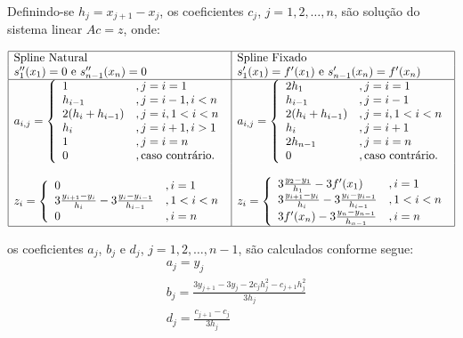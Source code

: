 Definindo-se $h_j = x_{j+1} - x_j$, os coeficientes $c_j$, $j=1,2,\dotsc,n$, são solução do sistema linear $Ac = z$, onde:
\begin{small}
  \begin{equation*}
  \begin{array}{|l|l|}\hline
    \text{Spline Natural} & \text{Spline Fixado}\\
    s_1''(x_1) = 0 \text{ e } s_{n-1}''(x_n) = 0 & s_1'(x_1) = f'(x_1) \text{ e } s_{n-1}'(x_n) = f'(x_n)\\ \hline
    a_{i,j} = \left\{
      \begin{array}{ll}
        1 &, j=i=1\\
        h_{i-1} &, j = i-1, i<n\\
        2(h_i + h_{i-1}) &, j=i, 1<i<n\\
        h_i &, j=i+1, i>1\\
        1 &, j=i=n\\
        0 &, \text{caso contrário.}
      \end{array}
\right. &  a_{i,j} = \left\{
      \begin{array}{ll}
        2h_1 &, j=i=1\\
        h_{i-1} &, j = i-1\\
        2(h_i + h_{i-1}) &, j=i, 1<i<n\\
        h_i &, j=i+1\\
        2h_{n-1} &, j=i=n\\
        0 &, \text{caso contrário.}
      \end{array}
\right.\\
&\\
z_i = \left\{
  \begin{array}{ll}
    0 &, i=1\\
    3\frac{y_{i+1}-y_i}{h_i} - 3\frac{y_i-y_{i-1}}{h_{i-1}} &, 1<i<n\\
    0 &, i=n
  \end{array}
\right. & z_i = \left\{
  \begin{array}{ll}
    3\frac{y_2-y_1}{h_1} - 3f'(x_1) &, i=1\\
    3\frac{y_{i+1}-y_i}{h_i} - 3\frac{y_i-y_{i-1}}{h_{i-1}} &, 1<i<n\\
    3f'(x_n) - 3\frac{y_n - y_{n-1}}{h_{n-1}} &, i=n
  \end{array}
\right. \\ \hline
  \end{array}
\end{equation*}
\end{small}
os coeficientes $a_j$, $b_j$ e $d_j$, $j=1,2,\dotsc,n-1$, são calculados conforme segue:
\begin{align*}
  &a_j = y_j\\
  &b_j = \frac{3y_{j+1} - 3y_j - 2c_jh_j^2 - c_{j+1}h_j^2}{3h_j}\\
  &d_j = \frac{c_{j+1} - c_j}{3h_j}
\end{align*}

% 